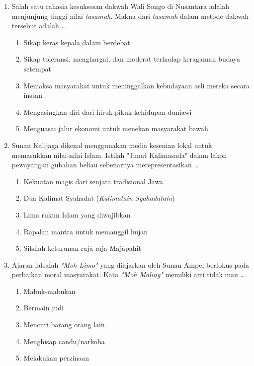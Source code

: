 \documentclass[12pt,a4paper]{article}
\begin{document}
\begin{enumerate}[leftmargin=*]
\item Salah satu rahasia kesuksesan dakwah Wali Songo di Nusantara adalah menjunjung tinggi nilai \textit{tasamuh}. Makna dari \textit{tasamuh} dalam metode dakwah tersebut adalah \dots
    \begin{enumerate}[label=\alph*.]
        \item Sikap keras kepala dalam berdebat
        \item Sikap toleransi, menghargai, dan moderat terhadap keragaman budaya setempat
        \item Memaksa masyarakat untuk meninggalkan kebudayaan asli mereka secara instan
        \item Mengasingkan diri dari hiruk-pikuk kehidupan duniawi
        \item Menguasai jalur ekonomi untuk menekan masyarakat bawah
    \end{enumerate}

\item Sunan Kalijaga dikenal menggunakan media kesenian lokal untuk memasukkan nilai-nilai Islam. Istilah "Jimat Kalimasada" dalam lakon pewayangan gubahan beliau sebenarnya merepresentasikan \dots
    \begin{enumerate}[label=\alph*.]
        \item Kekuatan magis dari senjata tradisional Jawa
        \item Dua Kalimat Syahadat (\textit{Kalimatain Syahadatain})
        \item Lima rukun Islam yang diwajibkan
        \item Rapalan mantra untuk memanggil hujan
        \item Silsilah keturunan raja-raja Majapahit
    \end{enumerate}

\item Ajaran falsafah \textit{"Moh Limo"} yang diajarkan oleh Sunan Ampel berfokus pada perbaikan moral masyarakat. Kata \textit{"Moh Maling"} memiliki arti tidak mau \dots
    \begin{enumerate}[label=\alph*.]
        \item Mabuk-mabukan
        \item Bermain judi
        \item Mencuri barang orang lain
        \item Menghisap candu/narkoba
        \item Melakukan perzinaan
    \end{enumerate}


\end{enumerate}
\end{document}
